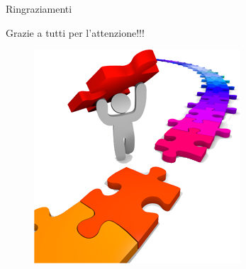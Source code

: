 %
\begin{frame}{Ringraziamenti}
\begin{center}
Grazie a tutti per l'attenzione!!!
\end{center}
\begin{figure}
\includegraphics[scale=1]{Images/End.png}
\end{figure}
\end{frame}